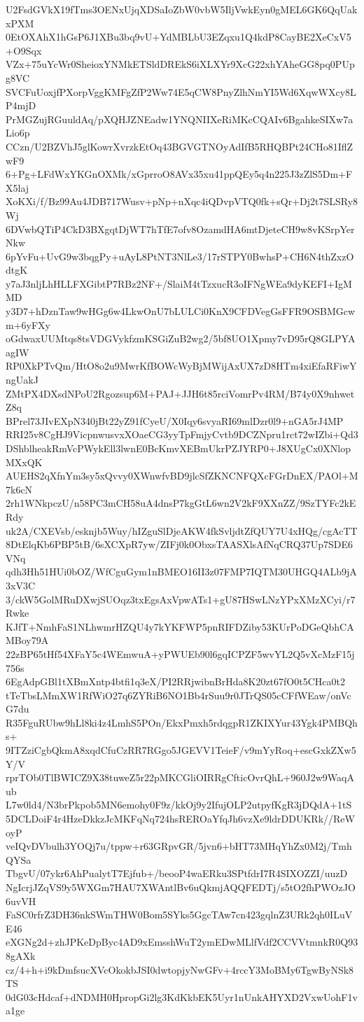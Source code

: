 U2FsdGVkX19fTms3OENxUjqXDSaIoZbW0vbW5IljVwkEyn0gMEL6GK6QqUakxPXM
0EtOXAhX1hGsP6J1XBu3bq9vU+YdMBLbU3EZqxu1Q4kdP8CayBE2XeCxV5+O9Sqx
VZx+75uYcWr0SheioxYNMkETSldDREkS6iXLXYr9XcG22xhYAheGG8pq0PUpg8VC
SVCFuUoxjfPXorpVggKMFgZfP2Ww74E5qCW8PnyZlhNmYI5Wd6XqwWXcy8LP4mjD
PrMGZujRGuuldAq/pXQHJZNEadw1YNQNIIXeRiMKcCQAIv6BgahkeSIXw7aLio6p
CCzn/U2BZVhJ5glKowrXvrzkEtOq43BGVGTNOyAdIfB5RHQBPt24CHo81IflZwF9
6+Pg+LFdWxYKGnOXMk/xGprroO8AVx35xu41ppQEy5q4n225J3zZlS5Dm+FX5laj
XoKXi/f/Bz99Au4JDB717Wusv+pNp+nXqc4iQDvpVTQ0fk+sQr+Dj2t7SLSRy8Wj
6DVwbQTiP4CkD3BXgqtDjWT7hTfE7ofv8OzamdHA6mtDjeteCH9w8vKSrpYerNkw
6pYvFu+UvG9w3bqgPy+uAyL8PtNT3NlLe3/17rSTPY0BwhsP+CH6N4thZxzOdtgK
y7aJ3nljLhHLLFXGibtP7RBz2NF+/SlaiM4tTzxucR3oIFNgWEa9dyKEFI+IgMMD
y3D7+hDznTaw9wHGg6w4LkwOnU7bLULCi0KnX9CFDVegGsFFR9OSBMGcwm+6yFXy
oGdwaxUUMtqs8tsVDGVykfzmKSGiZuB2wg2/5bf8UO1Xpmy7vD95rQ8GLPYAagIW
RP0XkPTvQm/HtO8o2u9MwrKfBOWcWyBjMWijAxUX7zD8HTm4xiEfaRFiwYngUakJ
ZMtPX4DXsdNPoU2Rgozsup6M+PAJ+JJH6t85rciVomrPv4RM/B74y0X9nhwetZ8q
BPrel73JIvEXpN340jBt22yZ91fCyeU/X0Iqy6svyaRI69mlDzr0l9+nGA5rJ4MP
RRI25v8CgHJ9VicpnwusvxXOaeCG3yyTpFmjyCvtb9DCZNpru1rct72wIZbi+Qd3
DShblheakRmVcPWykEll3lwnE0BcKmvXEBmUkrPZJYRP0+J8XUgCx0XNlopMXxQK
AUEHS2qXfnYm3sy5xQvvy0XWnwfvBD9jlcSfZKNCNFQXcFGrDnEX/PAOl+M7k6cN
2rh1WNkpczU/n58PC3mCH58uA4dnsP7kgGtL6wn2V2kF9XXnZZ/9SzTYFc2kERdy
uk2A/CXEVsb/esknjb5Wuy/hIZguSlDjeAKW4fkSvljdtZfQUY7U4xHQg/cgAcTT
8DtElqKb6PBP5tB/6sXCXpR7yw/ZIFj0k0ObxsTAASXlsAfNqCRQ37Up7SDE6VNq
qdh3Hh51HUi0bOZ/WfCguGym1nBMEO16II3z07FMP7IQTM30UHGQ4ALb9jA3xV3C
3/ckW5GolMRuDXwjSUOqz3txEgsAxVpwATs1+gU87HSwLNzYPxXMzXCyi/r7Rwke
KJfT+NmhFaS1NLhwmrHZQU4y7kYKFWP5pnRIFDZiby53KUrPoDGeQbhCAMBoy79A
22zBP65tHf54XFaY5c4WEmwuA+yPWUEb90l6gqICPZF5wvYL2Q5vXcMzF15j756s
6EgAdpGBl1tXBmXntp4btfi1q3eX/PI2RRjwibnBrHda8K20zt67fO0t5CHca0t2
tTeTbsLMmXW1RfWiO27q6ZYRiB6NO1Bb4rSuu9r0JTrQS05cCFfWEaw/onVcG7du
R35FguRUbw9hLl8ki4z4LmhS5POn/EkxPmxh5rdqgpR1ZKIXYur43Ygk4PMBQhs+
9ITZziCgbQkmA8xqdCfuCzRR7RGgo5JGEVV1TeieF/v9mYyRoq+escGxkZXw5Y/V
rprTOb0TlBWICZ9X38tuweZ5r22pMKCGliOIRRgCfticOvrQhL+960J2w9WaqAub
L7w0ld4/N3brPkpob5MN6emohy0F9z/kkOj9y2IfujOLP2utpyfKgR3jDQdA+1tS
5DCLDoiF4r4HzeDkkzJcMKFqNq724hsREROaYfqJh6vzXe9ldrDDUKRk//ReWoyP
veIQvDVbulh3YOQj7u/tppw+r63GRpvGR/5jvn6+bHT73MHqYhZx0M2j/TmhQYSa
TbgvU/07ykr6AhPualytT7Ejfub+/beooP4waERku3SPtfdrI7R4SIXOZZI/uuzD
NgIcrjJZqVS9y5WXGm7HAU7XWAntlBv6uQkmjAQQFEDTj/s5tO2fhPWOzJO6uvVH
FaSC0rfrZ3DH36nkSWmTHW0Bom5SYks5GgcTAw7cn423gqlnZ3URk2qh0ILuVE46
eXGNg2d+zhJPKeDpByc4AD9xEmsshWuT2ymEDwMLlfVdf2CCVVtmnkR0Q938gAXk
cz/4+h+i9kDmfsucXVcOkokbJSI0dwtopjyNwGFv+4rccY3MoBMy6TgwByNSk8TS
0dG03cHdcaf+dNDMH0HpropGi2lg3KdKkbEK5Uyr1nUnkAHYXD2VxwUohF1va1ge
